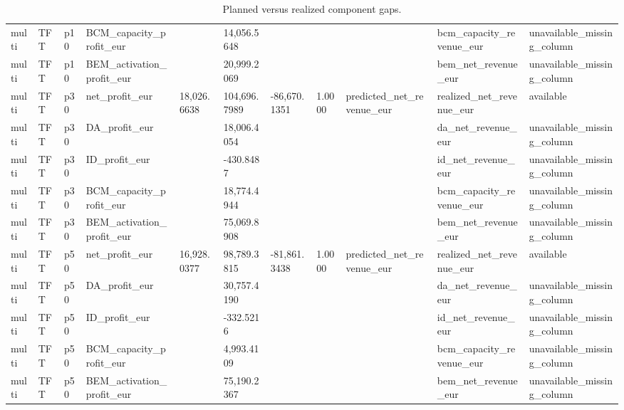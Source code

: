 \begin{table}[htbp]
\begin{tabular}{lllllllllll}
multi & TFT & p10 & BCM\_capacity\_profit\_eur &  & 14,056.5648 &  &  &  & bcm\_capacity\_revenue\_eur & unavailable\_missing\_column \\
multi & TFT & p10 & BEM\_activation\_profit\_eur &  & 20,999.2069 &  &  &  & bem\_net\_revenue\_eur & unavailable\_missing\_column \\
multi & TFT & p30 & net\_profit\_eur & 18,026.6638 & 104,696.7989 & -86,670.1351 & 1.0000 & predicted\_net\_revenue\_eur & realized\_net\_revenue\_eur & available \\
multi & TFT & p30 & DA\_profit\_eur &  & 18,006.4054 &  &  &  & da\_net\_revenue\_eur & unavailable\_missing\_column \\
multi & TFT & p30 & ID\_profit\_eur &  & -430.8487 &  &  &  & id\_net\_revenue\_eur & unavailable\_missing\_column \\
multi & TFT & p30 & BCM\_capacity\_profit\_eur &  & 18,774.4944 &  &  &  & bcm\_capacity\_revenue\_eur & unavailable\_missing\_column \\
multi & TFT & p30 & BEM\_activation\_profit\_eur &  & 75,069.8908 &  &  &  & bem\_net\_revenue\_eur & unavailable\_missing\_column \\
multi & TFT & p50 & net\_profit\_eur & 16,928.0377 & 98,789.3815 & -81,861.3438 & 1.0000 & predicted\_net\_revenue\_eur & realized\_net\_revenue\_eur & available \\
multi & TFT & p50 & DA\_profit\_eur &  & 30,757.4190 &  &  &  & da\_net\_revenue\_eur & unavailable\_missing\_column \\
multi & TFT & p50 & ID\_profit\_eur &  & -332.5216 &  &  &  & id\_net\_revenue\_eur & unavailable\_missing\_column \\
multi & TFT & p50 & BCM\_capacity\_profit\_eur &  & 4,993.4109 &  &  &  & bcm\_capacity\_revenue\_eur & unavailable\_missing\_column \\
multi & TFT & p50 & BEM\_activation\_profit\_eur &  & 75,190.2367 &  &  &  & bem\_net\_revenue\_eur & unavailable\_missing\_column \\
\bottomrule
\end{tabular}
\caption{Planned versus realized component gaps.}
\label{tab:planned\_vs\_realized\_by\_component}
\end{table}
